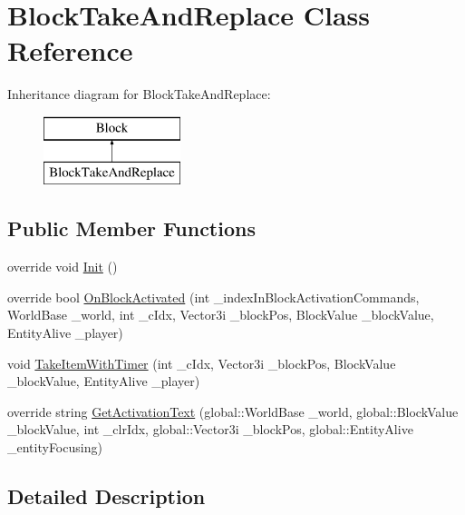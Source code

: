\hypertarget{class_block_take_and_replace}{}\section{Block\+Take\+And\+Replace Class Reference}
\label{class_block_take_and_replace}
Inheritance diagram for Block\+Take\+And\+Replace\+:\begin{figure}[H]
\begin{center}
\leavevmode
\includegraphics[height=2.000000cm]{de/dc5/class_block_take_and_replace}
\end{center}
\end{figure}
\subsection*{Public Member Functions}
\begin{DoxyCompactItemize}
\item 
override void \mbox{\hyperlink{class_block_take_and_replace_a2ca56402006143682cadc4b7d6b20d17}{Init}} ()
\item 
override bool \mbox{\hyperlink{class_block_take_and_replace_af23451b48625362fa68560fed6655440}{On\+Block\+Activated}} (int \+\_\+index\+In\+Block\+Activation\+Commands, World\+Base \+\_\+world, int \+\_\+c\+Idx, Vector3i \+\_\+block\+Pos, Block\+Value \+\_\+block\+Value, Entity\+Alive \+\_\+player)
\item 
void \mbox{\hyperlink{class_block_take_and_replace_aaf0c8d63af712312d2d0c97fbb94682d}{Take\+Item\+With\+Timer}} (int \+\_\+c\+Idx, Vector3i \+\_\+block\+Pos, Block\+Value \+\_\+block\+Value, Entity\+Alive \+\_\+player)
\item 
override string \mbox{\hyperlink{class_block_take_and_replace_af4a8e2aeb473d7f8eca262210128b9b1}{Get\+Activation\+Text}} (global\+::\+World\+Base \+\_\+world, global\+::\+Block\+Value \+\_\+block\+Value, int \+\_\+clr\+Idx, global\+::\+Vector3i \+\_\+block\+Pos, global\+::\+Entity\+Alive \+\_\+entity\+Focusing)
\end{DoxyCompactItemize}


\subsection{Detailed Description}


